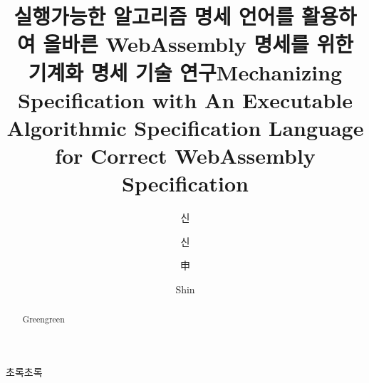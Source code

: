 \documentclass[master,english,draft]{kaist-ucs} %
\title[korean] {실행가능한 알고리즘 명세 언어를 활용하여 올바른 WebAssembly 명세를 위한 기계화 명세 기술 연구}
\title[english]{Mechanizing Specification with An Executable Algorithmic Specification Language for Correct WebAssembly Specification}
\author[korean] {신}{원 호}
\author[korean2] {신}{원호}    %
\author[chinese]{申}{元 鎬}
\author[english]{Shin}{Wonho}
\begin{document}

 \thesisinfo
  \begin{summary}
  초록초록

  \end{summary}

  \begin{Korkeyword}
  \end{Korkeyword}


  \begin{abstract}
  Greengreen
  \end{abstract}

  \begin{Engkeyword}
  \end{Engkeyword}


  \addtocounter{pagemarker}{1}                 %
  \newpage



  \tableofcontents

  \listoftables

  \listoffigures
















\end{document}

